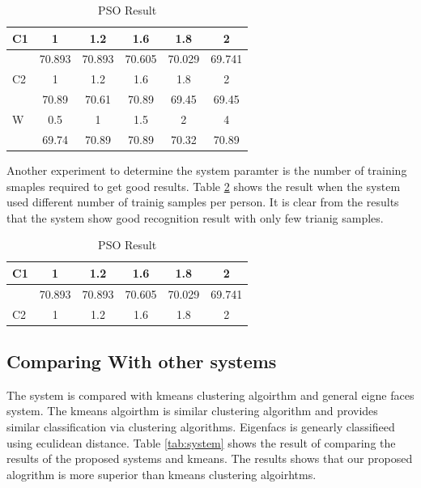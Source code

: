 \documentclass[a4paper,twoside]{article}
\begin{document}
\begin{table}
	\centering
		\caption{PSO Result }
	\label{tab:PSO1}
		\begin{tabular}{|l|c|c|c|c|c|}
		 \hline
C1 &	1	&1.2&	1.6&	1.8 &	2	\\ \hline
	&70.893	&70.893	&70.605	&70.029	&69.741 \\  \hline
C2	&	1	&1.2&	1.6&	1.8 &	2	\\ \hline
	&70.89	&70.61	&70.89	&69.45	&69.45 \\ \hline
W	&0.5&	1	&1.5	&2&	4	\\ \hline
	&69.74	&70.89&	70.89	&70.32&	70.89	\\ \hline
\end{tabular}
\end{table}

Another experiment to determine the system paramter is the number of training smaples required to get good results. Table \ref{tab:PSOtrainTest} shows the result when the system used different number of trainig samples per person. It is clear from the results that the system show good recognition result with only few trianig samples.

\begin{table}
	\centering
		\caption{PSO Result }
	\label{tab:PSOtrainTest}
		\begin{tabular}{|l|c|c|c|c|c|}
		 \hline
C1 &	1	&1.2&	1.6&	1.8 &	2	\\ \hline
	&70.893	&70.893	&70.605	&70.029	&69.741 \\  \hline
C2	&	1	&1.2&	1.6&	1.8 &	2	\\ \hline

\end{tabular}
\end{table}

\subsection {Comparing With other systems}
\label{sec:comparingSystems}

The system is compared with kmeans clustering algoirthm and general eigne faces system. The kmeans algoirthm is similar clustering algorithm and provides similar classification via clustering algorithms. Eigenfacs is genearly classifieed using eculidean distance. Table \ref{tab:system} shows the result of comparing the results of the proposed systems and kmeans. The results shows that our proposed alogrithm is more superior than kmeans clustering algoirhtms.
\end{document}

